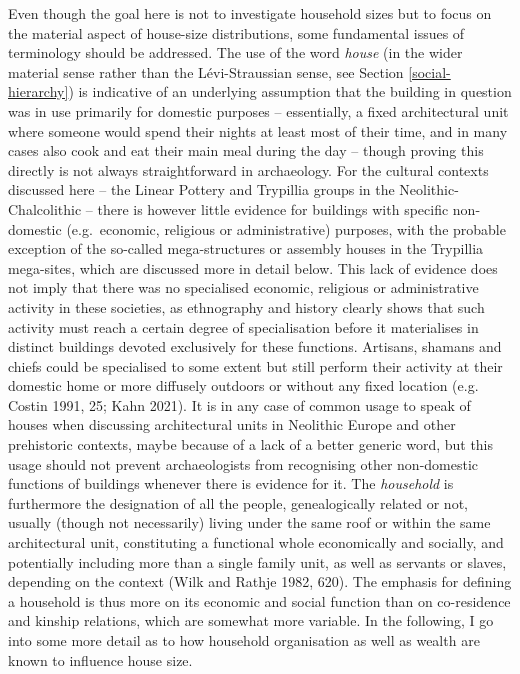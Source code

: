 \documentclass[
  12pt,
  a4paper, twoside]{book}
\begin{document}
Even though the goal here is not to investigate household sizes but to focus on the material aspect of house-size distributions, some fundamental issues of terminology should be addressed. The use of the word \emph{house} (in the wider material sense rather than the Lévi-Straussian sense, see Section \ref{social-hierarchy}) is indicative of an underlying assumption that the building in question was in use primarily for domestic purposes -- essentially, a fixed architectural unit where someone would spend their nights at least most of their time, and in many cases also cook and eat their main meal during the day -- though proving this directly is not always straightforward in archaeology. For the cultural contexts discussed here -- the Linear Pottery and Trypillia groups in the Neolithic-Chalcolithic -- there is however little evidence for buildings with specific non-domestic (e.g.~economic, religious or administrative) purposes, with the probable exception of the so-called mega-structures or assembly houses in the Trypillia mega-sites, which are discussed more in detail below. This lack of evidence does not imply that there was no specialised economic, religious or administrative activity in these societies, as ethnography and history clearly shows that such activity must reach a certain degree of specialisation before it materialises in distinct buildings devoted exclusively for these functions. Artisans, shamans and chiefs could be specialised to some extent but still perform their activity at their domestic home or more diffusely outdoors or without any fixed location (e.g. Costin 1991, 25; Kahn 2021). It is in any case of common usage to speak of houses when discussing architectural units in Neolithic Europe and other prehistoric contexts, maybe because of a lack of a better generic word, but this usage should not prevent archaeologists from recognising other non-domestic functions of buildings whenever there is evidence for it. The \emph{household} is furthermore the designation of all the people, genealogically related or not, usually (though not necessarily) living under the same roof or within the same architectural unit, constituting a functional whole economically and socially, and potentially including more than a single family unit, as well as servants or slaves, depending on the context (Wilk and Rathje 1982, 620). The emphasis for defining a household is thus more on its economic and social function than on co-residence and kinship relations, which are somewhat more variable. In the following, I go into some more detail as to how household organisation as well as wealth are known to influence house size.
\end{document}
